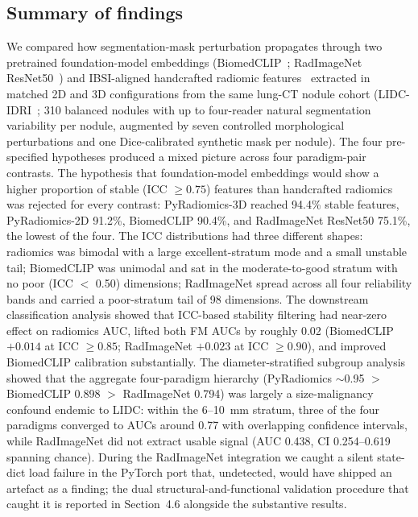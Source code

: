 
\subsection{Summary of findings}

We compared how segmentation-mask perturbation propagates through two pretrained foundation-model embeddings (BiomedCLIP~\cite{zhang2024biomedclip}; RadImageNet ResNet50~\cite{mei2022radimagenet}) and IBSI-aligned handcrafted radiomic features~\cite{vangriethuysen2017,zwanenburg2020} extracted in matched 2D and 3D configurations from the same lung-CT nodule cohort (LIDC-IDRI~\cite{armato2011}; 310 balanced nodules with up to four-reader natural segmentation variability per nodule, augmented by seven controlled morphological perturbations and one Dice-calibrated synthetic mask per nodule). The four pre-specified hypotheses produced a mixed picture across four paradigm-pair contrasts. The hypothesis that foundation-model embeddings would show a higher proportion of stable (ICC $\geq 0.75$) features than handcrafted radiomics was rejected for every contrast: PyRadiomics-3D reached 94.4\% stable features, PyRadiomics-2D 91.2\%, BiomedCLIP 90.4\%, and RadImageNet ResNet50 75.1\%, the lowest of the four. The ICC distributions had three different shapes: radiomics was bimodal with a large excellent-stratum mode and a small unstable tail; BiomedCLIP was unimodal and sat in the moderate-to-good stratum with no poor (ICC $<$ 0.50) dimensions; RadImageNet spread across all four reliability bands and carried a poor-stratum tail of 98 dimensions. The downstream classification analysis showed that ICC-based stability filtering had near-zero effect on radiomics AUC, lifted both FM AUCs by roughly 0.02 (BiomedCLIP $+0.014$ at ICC $\geq 0.85$; RadImageNet $+0.023$ at ICC $\geq 0.90$), and improved BiomedCLIP calibration substantially. The diameter-stratified subgroup analysis showed that the aggregate four-paradigm hierarchy (PyRadiomics $\sim$0.95 $>$ BiomedCLIP 0.898 $>$ RadImageNet 0.794) was largely a size-malignancy confound endemic to LIDC: within the 6--10~mm stratum, three of the four paradigms converged to AUCs around 0.77 with overlapping confidence intervals, while RadImageNet did not extract usable signal (AUC 0.438, CI 0.254--0.619 spanning chance). During the RadImageNet integration we caught a silent state-dict load failure in the PyTorch port that, undetected, would have shipped an artefact as a finding; the dual structural-and-functional validation procedure that caught it is reported in Section~4.6 alongside the substantive results.

